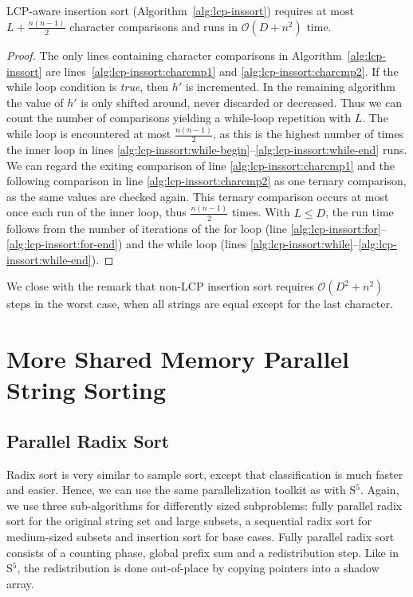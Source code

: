 \documentclass[a4paper]{myjournal}
\newcommand{\Oh}[1]{\mathcal{O}\!\left( #1\right)}
\def\Oh#1{\mathcal{O}(#1)}
\begin{document}
\begin{theorem}
  LCP-aware insertion sort (Algorithm~\ref{alg:lcp-inssort}) requires at most $L
  + \frac{n (n-1)}{2}$ character comparisons and runs in $\Oh{D + n^2}$ time.
\end{theorem}
\begin{proof}
  The only lines containing character comparisons in
  Algorithm~\ref{alg:lcp-inssort} are lines~\ref{alg:lcp-inssort:charcmp1} and
  \ref{alg:lcp-inssort:charcmp2}.  If the while loop condition is \textsl{true},
  then $h'$ is incremented.  In the remaining algorithm the value of $h'$ is
  only shifted around, never discarded or decreased.  Thus we can count the
  number of comparisons yielding a while-loop repetition with $L$.  The while
  loop is encountered at most $\frac{n (n-1)}{2}$, as this is the highest number
  of times the inner loop in lines
  \ref{alg:lcp-inssort:while-begin}--\ref{alg:lcp-inssort:while-end} runs.  We
  can regard the exiting comparison of line \ref{alg:lcp-inssort:charcmp1} and
  the following comparison in line \ref{alg:lcp-inssort:charcmp2} as one ternary
  comparison, as the same values are checked again.  This ternary comparison
  occurs at most once each run of the inner loop, thus $\frac{n (n-1)}{2}$
  times.  With $L \leq D$, the run time follows from the number of iterations of
  the for loop (line \ref{alg:lcp-inssort:for}--\ref{alg:lcp-inssort:for-end})
  and the while loop (lines
  \ref{alg:lcp-inssort:while}--\ref{alg:lcp-inssort:while-end}).
\end{proof}

We close with the remark that non-LCP insertion sort requires $\Oh{D^2 + n^2}$
steps in the worst case, when all strings are equal except for the last
character.

\section{More Shared Memory Parallel String Sorting}\label{sec:more-parasort}

\subsection{Parallel Radix Sort}\label{sec:para-radixsort}

Radix sort is very similar to sample sort, except that classification is much
faster and easier. Hence, we can use the same parallelization toolkit as with
S$^5$. Again, we use three sub-algorithms for differently sized subproblems:
fully parallel radix sort for the original string set and large subsets, a
sequential radix sort for medium-sized subsets and insertion sort for base
cases. Fully parallel radix sort consists of a counting phase, global prefix sum
and a redistribution step. Like in S$^5$, the redistribution is done
out-of-place by copying pointers into a shadow array.
\end{document}
